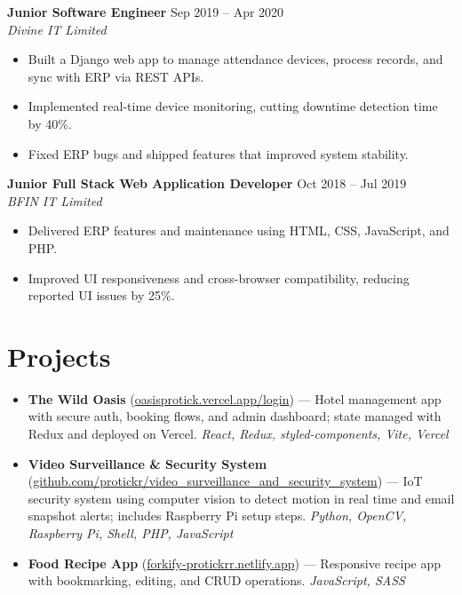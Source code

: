 \documentclass[a4paper,10pt]{article}
\begin{document}
\textbf{Junior Software Engineer} \hfill Sep 2019 -- Apr 2020\\[-1pt]
\textit{Divine IT Limited}\\[-3pt]
\begin{itemize}
  \item Built a Django web app to manage attendance devices, process records, and sync with ERP via REST APIs.
  \item Implemented real-time device monitoring, cutting downtime detection time by 40\%.
  \item Fixed ERP bugs and shipped features that improved system stability.
\end{itemize}

\textbf{Junior Full Stack Web Application Developer} \hfill Oct 2018 -- Jul 2019\\[-1pt]
\textit{BFIN IT Limited}\\[-3pt]
\begin{itemize}
  \item Delivered ERP features and maintenance using HTML, CSS, JavaScript, and PHP.
  \item Improved UI responsiveness and cross-browser compatibility, reducing reported UI issues by 25\%.
\end{itemize}

\section*{Projects}
\begin{itemize}
  \item \textbf{The Wild Oasis} (\href{https://oasisprotick.vercel.app/login}{oasisprotick.vercel.app/login}) --- Hotel management app with secure auth, booking flows, and admin dashboard; state managed with Redux and deployed on Vercel. \emph{React, Redux, styled-components, Vite, Vercel}
  \item \textbf{Video Surveillance \& Security System} (\href{https://github.com/protickr/video_surveillance_and_security_system}{github.com/protickr/video\_surveillance\_and\_security\_system}) --- IoT security system using computer vision to detect motion in real time and email snapshot alerts; includes Raspberry Pi setup steps. \emph{Python, OpenCV, Raspberry Pi, Shell, PHP, JavaScript}
  \item \textbf{Food Recipe App} (\href{https://forkify-protickrr.netlify.app}{forkify-protickrr.netlify.app}) --- Responsive recipe app with bookmarking, editing, and CRUD operations. \emph{JavaScript, SASS}
\end{itemize}
\end{document}
